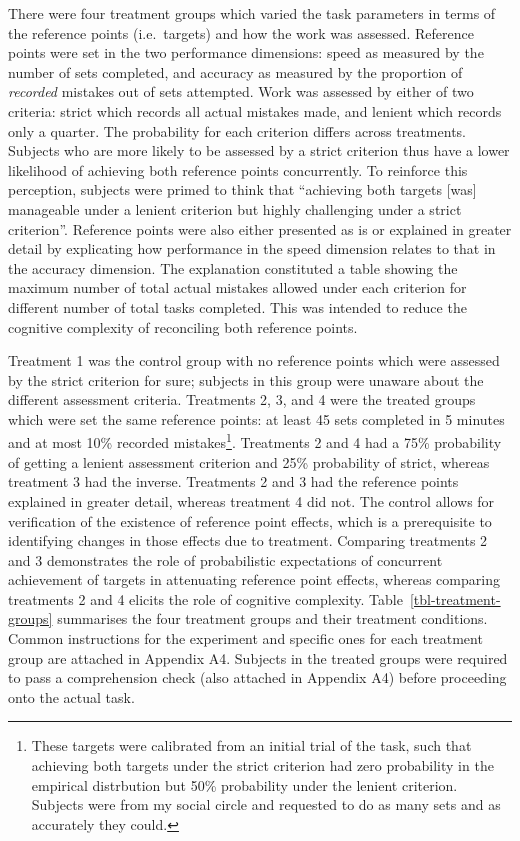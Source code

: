 \documentclass[
  12,
  letterpaper,
  DIV=11,
  numbers=noendperiod]{scrartcl}
\begin{document}
There were four treatment groups which varied the task parameters in
terms of the reference points (i.e.~targets) and how the work was
assessed. Reference points were set in the two performance dimensions:
speed as measured by the number of sets completed, and accuracy as
measured by the proportion of \emph{recorded} mistakes out of sets
attempted. Work was assessed by either of two criteria: strict which
records all actual mistakes made, and lenient which records only a
quarter. The probability for each criterion differs across treatments.
Subjects who are more likely to be assessed by a strict criterion thus
have a lower likelihood of achieving both reference points concurrently.
To reinforce this perception, subjects were primed to think that
``achieving both targets {[}was{]} manageable under a lenient criterion
but highly challenging under a strict criterion''. Reference points were
also either presented as is or explained in greater detail by
explicating how performance in the speed dimension relates to that in
the accuracy dimension. The explanation constituted a table showing the
maximum number of total actual mistakes allowed under each criterion for
different number of total tasks completed. This was intended to reduce
the cognitive complexity of reconciling both reference points.

Treatment 1 was the control group with no reference points which were
assessed by the strict criterion for sure; subjects in this group were
unaware about the different assessment criteria. Treatments 2, 3, and 4
were the treated groups which were set the same reference points: at
least 45 sets completed in 5 minutes and at most 10\% recorded
mistakes\footnote{These targets were calibrated from an initial trial of
  the task, such that achieving both targets under the strict criterion
  had zero probability in the empirical distrbution but 50\% probability
  under the lenient criterion. Subjects were from my social circle and
  requested to do as many sets and as accurately they could.}.
Treatments 2 and 4 had a 75\% probability of getting a lenient
assessment criterion and 25\% probability of strict, whereas treatment 3
had the inverse. Treatments 2 and 3 had the reference points explained
in greater detail, whereas treatment 4 did not. The control allows for
verification of the existence of reference point effects, which is a
prerequisite to identifying changes in those effects due to treatment.
Comparing treatments 2 and 3 demonstrates the role of probabilistic
expectations of concurrent achievement of targets in attenuating
reference point effects, whereas comparing treatments 2 and 4 elicits
the role of cognitive complexity. Table~\ref{tbl-treatment-groups}
summarises the four treatment groups and their treatment conditions.
Common instructions for the experiment and specific ones for each
treatment group are attached in Appendix A4. Subjects in the treated
groups were required to pass a comprehension check (also attached in
Appendix A4) before proceeding onto the actual task.
\end{document}
